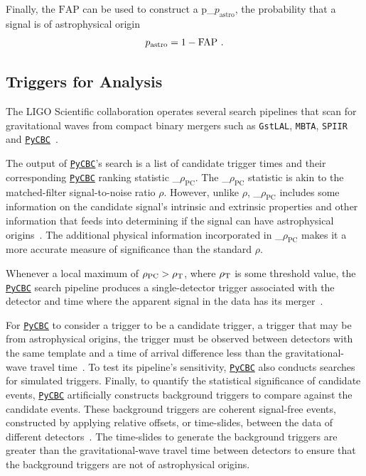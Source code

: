 \documentclass[%
 nofootinbib,
 amsmath,amssymb,
 aps,
 twocolumn
]{revtex4-2}
\newcommand{\pycbc}{{\sc \href{https://pycbc.org/}{\texttt{PyCBC}}}\xspace}
\newcommand{\fancytext}[1]{{\relax\ifmmode#1\else $#1$\fi}\xspace}
\newcommand{\mathcmd}[1]{{\sc \relax\ifmmode#1\else $#1$\fi}\xspace}
\newcommand{\pycbcstat}{\mathcmd{\rho_\text{PC}}}
\newcommand{\snr}{\mathcmd{\rho}}
\newcommand{\fap}{\mathcmd{\text{FAP}}}
\newcommand{\pastro}{\fancytext{p_\text{astro}}}
\begin{document}
Finally, the \fap can be used to construct a \pastro, the probability that a signal is of astrophysical origin~\cite{pastro_1,pastro_2,pastro_3}
\begin{equation}
    \pastro = 1 -  \fap \ .
\end{equation}


\subsection{Triggers for Analysis}

The LIGO Scientific collaboration operates several search pipelines that scan for gravitational waves from compact binary mergers such as \texttt{GstLAL}, \texttt{MBTA}, \texttt{SPIIR} and \pycbc~\cite{GWTC1}.

The output of \pycbc's search is a list of candidate trigger times and their corresponding \pycbc ranking statistic \pycbcstat. The \pycbcstat statistic is akin to the matched-filter signal-to-noise ratio \snr. However, unlike \snr, \pycbcstat includes some information on the candidate signal's intrinsic and extrinsic properties and other information that feeds into determining if the signal can have astrophysical origins~\cite{pycbc_og6}. The additional physical information incorporated in \pycbcstat makes it a more accurate measure of significance than the standard \snr. 

Whenever a local maximum of $\pycbcstat > \snr_\text{T}$, where $\snr_\text{T}$ is some threshold value, the \pycbc search pipeline produces a single-detector trigger associated with the detector and time where the apparent signal in the data has its merger~\cite{pycbc_og6}.

For \pycbc to consider a trigger to be a candidate trigger, a trigger that may be from astrophysical origins, the trigger must be observed between detectors with the same template and a time of arrival difference less than the gravitational-wave travel time~\cite{pycbc_og1}. To test its pipeline's sensitivity, \pycbc also conducts searches for simulated triggers. Finally, to quantify the statistical significance of candidate events, \pycbc artificially constructs background triggers to compare against the candidate events. These background triggers are coherent signal-free events, constructed by applying relative offsets, or time-slides, between the data of different detectors~\cite{pycbc_og6}. The time-slides to generate the background triggers are greater than the gravitational-wave travel time between detectors to ensure that the background triggers are not of astrophysical origins. 
\end{document}
